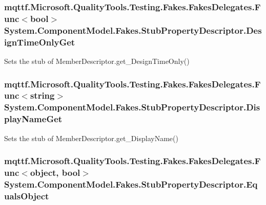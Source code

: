 \hypertarget{class_system_1_1_component_model_1_1_fakes_1_1_stub_property_descriptor_adec0ee1914bd3bf2be14bf107e9720b5}{
\subsubsection[{Design\-Time\-Only\-Get}]{\setlength{\rightskip}{0pt plus 5cm}mqttf.\-Microsoft.\-Quality\-Tools.\-Testing.\-Fakes.\-Fakes\-Delegates.\-Func$<$bool$>$ System.\-Component\-Model.\-Fakes.\-Stub\-Property\-Descriptor.\-Design\-Time\-Only\-Get}}\label{class_system_1_1_component_model_1_1_fakes_1_1_stub_property_descriptor_adec0ee1914bd3bf2be14bf107e9720b5}


Sets the stub of Member\-Descriptor.\-get\-\_\-\-Design\-Time\-Only()

\hypertarget{class_system_1_1_component_model_1_1_fakes_1_1_stub_property_descriptor_a9914b8f48a9a9121454e61276beb1ffd}{
\subsubsection[{Display\-Name\-Get}]{\setlength{\rightskip}{0pt plus 5cm}mqttf.\-Microsoft.\-Quality\-Tools.\-Testing.\-Fakes.\-Fakes\-Delegates.\-Func$<$string$>$ System.\-Component\-Model.\-Fakes.\-Stub\-Property\-Descriptor.\-Display\-Name\-Get}}\label{class_system_1_1_component_model_1_1_fakes_1_1_stub_property_descriptor_a9914b8f48a9a9121454e61276beb1ffd}


Sets the stub of Member\-Descriptor.\-get\-\_\-\-Display\-Name()

\hypertarget{class_system_1_1_component_model_1_1_fakes_1_1_stub_property_descriptor_a6a5d0e93dede271e925cca1b00867e55}{
\subsubsection[{Equals\-Object}]{\setlength{\rightskip}{0pt plus 5cm}mqttf.\-Microsoft.\-Quality\-Tools.\-Testing.\-Fakes.\-Fakes\-Delegates.\-Func$<$object, bool$>$ System.\-Component\-Model.\-Fakes.\-Stub\-Property\-Descriptor.\-Equals\-Object}}\label{class_system_1_1_component_model_1_1_fakes_1_1_stub_property_descriptor_a6a5d0e93dede271e925cca1b00867e55}



